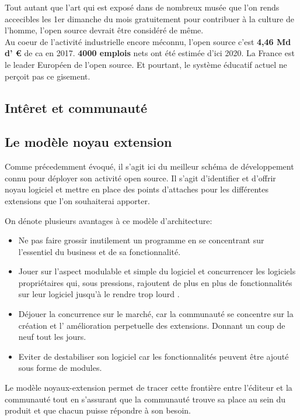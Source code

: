 			Tout autant que l'art qui est exposé dans de nombreux musée que l'on rends accecibles les 1er dimanche du mois gratuitement pour contribuer à la culture de l'homme, l'open source devrait être considéré de même.\\

			Au coeur de l'activité industrielle encore méconnu, l'open source c'est \textbf{4,46 Md d' \euro{}} de \acrshort{ca} en 2017. \textbf{4000 emplois} nets ont été estimée d'ici 2020. La France est le leader Européen de l'open source. Et pourtant, le système éducatif actuel ne perçoit pas ce gisement. 

		\subsection{Intêret et communauté}

		\subsection{Le modèle noyau extension}

			Comme précedemment évoqué, il s'agit ici du meilleur schéma de développement connu pour déployer son activité open source. Il s'agit d'identifier et d'offrir noyau logiciel et mettre en place des points d'attaches pour les différentes extensions que l'on souhaiterai apporter.

			On dénote plusieurs avantages à ce modèle d'architecture:

			\begin{itemize}[label=\textbullet, font=\LARGE \color{burntorange}]
			\item Ne pas faire grossir inutilement un programme en se concentrant sur l'essentiel du business et de sa fonctionnalité.
			\item Jouer sur l'aspect modulable et simple du logiciel et concurrencer les logiciels propriétaires qui, sous pressions, rajoutent de plus en plus de fonctionnalités sur leur logiciel jusqu'à le rendre trop lourd .
			\item Déjouer la concurrence sur le marché, car la communauté se concentre sur la création et l' amélioration perpetuelle des extensions. Donnant un coup de neuf tout les jours.
			\item Eviter de destabiliser son logiciel car les fonctionnalités peuvent être ajouté sous forme de modules.
			\end{itemize}

			Le modèle noyaux-extension permet de tracer cette frontière entre l'éditeur et la communauté tout en s'assurant que la communauté trouve sa place au sein du produit et que chacun puisse répondre à son besoin.

